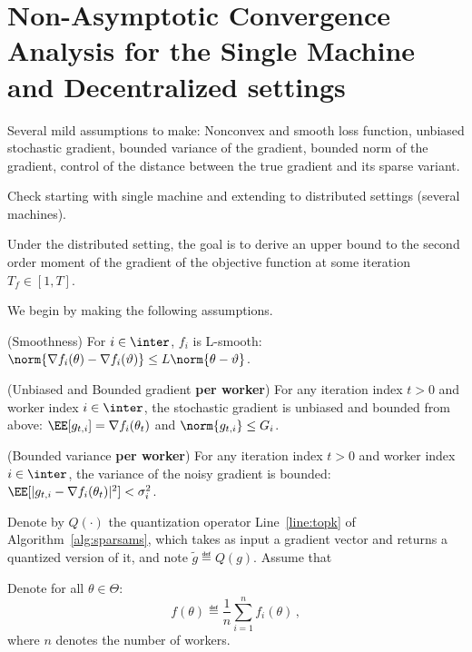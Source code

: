 \documentclass[11pt]{article}
\begin{document}
\section{Non-Asymptotic Convergence Analysis for the Single Machine and Decentralized settings}

Several mild assumptions to make: Nonconvex and smooth loss function, unbiased stochastic gradient, bounded variance of the gradient, bounded norm of the gradient, control of the distance between the true gradient and its sparse variant.

Check \citep{chen2020quantized} starting with single machine  and extending to distributed settings (several machines).


Under the distributed setting, the goal is to derive an upper bound to the second order moment of the gradient of the objective function at some iteration $T_f \in [1, T]$.


We begin by making the following assumptions.

\begin{assumption}\label{ass:smooth}(Smoothness)
For $i \in \inter$, $f_i$ is  L-smooth: $\norm{\nabla f_i (\theta) - \nabla f_i (\vartheta)} \leq L \norm{\theta-\vartheta}$.
\end{assumption}

\begin{assumption}\label{ass:boundgrad}(Unbiased and Bounded gradient \textbf{per worker})
For any iteration index $t >0$ and worker index $i \in \inter$, the stochastic gradient is unbiased and bounded from above: $\EE[g_{t,i}] = \nabla f_i(\theta_t)$ and $\norm{g_{t,i}} \leq G_i$.
\end{assumption}

\begin{assumption}\label{ass:var}(Bounded variance \textbf{per worker})
For any iteration index $t >0$ and worker index $i \in \inter$, the variance of the noisy gradient is bounded: $\EE[|g_{t,i} - \nabla f_i(\theta_t)|^2] < \sigma_i^2$.
\end{assumption}

Denote by $Q(\cdot)$ the quantization operator Line~\ref{line:topk} of Algorithm~\ref{alg:sparsams}, which takes as input a gradient vector and returns a quantized version of it, and note $\tilde{g} \eqdef Q(g)$.
Assume that



Denote for all $\theta \in \Theta$:
\begin{equation}\label{eq:obj}
f(\theta) \eqdef  \frac{1}{n} \sum_{i=1}^n f_i(\theta) \, ,
\end{equation} 
where $n$ denotes the number of workers.
\end{document}
